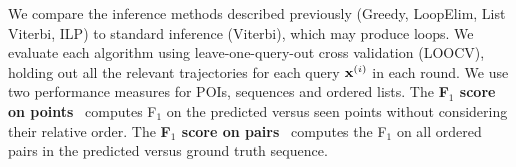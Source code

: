 \begin{table}[t]
		\label{tab:data}
	\vspace{-1.75\baselineskip}
\end{table}

%

We compare the inference methods described previously ({\sc Greedy}, {\sc LoopElim}, {\sc List Viterbi}, {\sc ILP})
to standard inference ({\sc Viterbi}), which may produce loops.
We evaluate each algorithm using leave-one-query-out cross validation (LOOCV),
\ie holding out all the relevant trajectories for each query $\mathbf{x}^{(i)}$ in each round.
We use two performance measures for POIs, sequences and ordered lists.
The {\bf F$_1$ score on points}~\cite{ijcai15} computes F$_1$ on the predicted versus seen points
without considering their relative order.
The {\bf F$_1$ score on pairs}~\cite{cikm16paper} computes the F$_1$ on all ordered pairs in the predicted versus ground truth sequence. %



